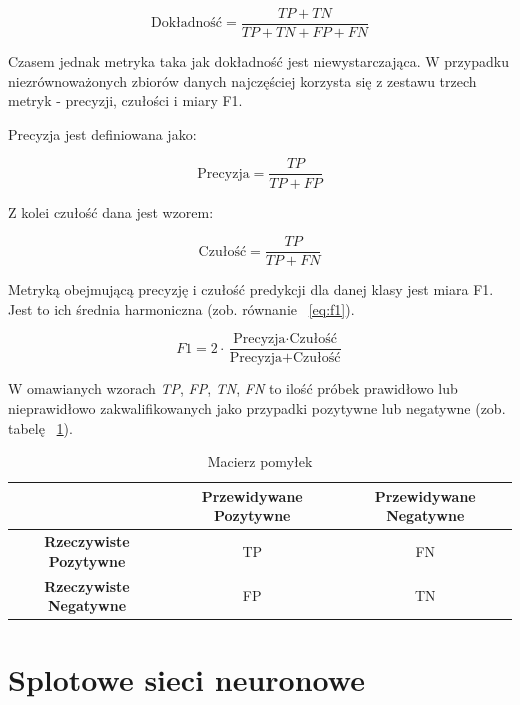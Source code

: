 \begin{equation}
    \text{Dokładność} = \frac{TP + TN}{TP + TN + FP + FN}\label{eq:accuracy}
\end{equation}

Czasem jednak metryka taka jak dokładność jest niewystarczająca.
W przypadku niezrównoważonych zbiorów danych najczęściej korzysta się z zestawu trzech metryk - precyzji, czułości i miary F1.

Precyzja jest definiowana jako:

\begin{equation}
    \text{Precyzja} = \frac{TP}{TP + FP}\label{eq:precision}
\end{equation}

Z kolei czułość dana jest wzorem:

\begin{equation}
    \text{Czułość} = \frac{TP}{TP + FN}\label{eq:recall}
\end{equation}

Metryką obejmującą precyzję i czułość predykcji dla danej klasy jest miara F1.
Jest to ich średnia harmoniczna (zob.
równanie ~\ref{eq:f1}).

\begin{equation}
    F1 = 2 \cdot \frac{\text{Precyzja} \cdot \text{Czułość}}{\text{Precyzja} + \text{Czułość}}\label{eq:f1}
\end{equation}

W omawianych wzorach \textit{TP}, \textit{FP}, \textit{TN}, \textit{FN} to ilość próbek prawidłowo lub nieprawidłowo zakwalifikowanych jako przypadki pozytywne lub negatywne (zob. tabelę ~\ref{tab:cases}).

\begin{table}[h]
    \centering
    \begin{tabular}{|c|c|c|}
        \hline
        & \textbf{Przewidywane Pozytywne} & \textbf{Przewidywane Negatywne} \\ \hline
        \textbf{Rzeczywiste Pozytywne} & TP                              & FN                              \\ \hline
        \textbf{Rzeczywiste Negatywne} & FP                              & TN                              \\ \hline
    \end{tabular}
    \caption{Macierz pomyłek}\label{tab:cases}
\end{table}


\section{Splotowe sieci neuronowe}

